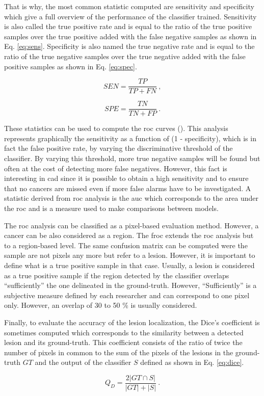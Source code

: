That is why, the most common statistic computed are sensitivity and specificity which give a full overview of the performance of the classifier trained. Sensitivity is also called the true positive rate and is equal to the ratio of the true positive samples over the true positive added with the false negative samples as shown in Eq. \eqref{eq:sens}. Specificity is also named the true negative rate and is equal to the ratio of the true negative samples over the true negative added with the false positive samples as shown in Eq. \eqref{eq:spec}.

\begin{equation}
	SEN = \frac{TP}{TP+FN} \ ,
	\label{eq:sens}
\end{equation}

\begin{equation}
	SPE = \frac{TN}{TN+FP} \ .
	\label{eq:spec}
\end{equation}

These statistics can be used to compute the \acf{roc} curves (\cite{Metz2006}). This analysis represents graphically the sensitivity as a function of (1 - specificity), which is in fact the false positive rate, by varying the discriminative threshold of the classifier. By varying this threshold, more true negative samples will be found but often at the cost of detecting more false negatives. However, this fact is interesting in \ac{cad} since it is possible to obtain a high sensitivity and to ensure that no cancers are missed even if more false alarms have to be investigated. A statistic derived from \ac{roc} analysis is the \acf{auc} which corresponds to the area under the \ac{roc} and is a measure used to make comparisons between models.

The \ac{roc} analysis can be classified as a pixel-based evaluation method. However, a cancer can be also considered as a region. The \acf{froc} extends the \ac{roc} analysis but to a region-based level. The same confusion matrix can be computed were the sample are not pixels any more but refer to a lesion. However, it is important to define what is a true positive sample in that case. Usually, a lesion is considered as a true positive sample if the region detected by the classifier overlaps ``sufficiently'' the one delineated in the ground-truth. However, ``Sufficiently'' is a subjective measure defined by each researcher and can correspond to one pixel only. However, an overlap of 30 to 50 \% is usually considered.

Finally, to evaluate the accuracy of the lesion localization, the Dice's coefficient is sometimes computed which corresponds to the similarity between a detected lesion and its ground-truth. This coefficient consists of the ratio of twice the number of pixels in common to the sum of the pixels of the lesions in the ground-truth $GT$ and the output of the classifier $S$ defined as shown in Eq. \eqref{eq:dice}.

\begin{equation}
	Q_D = \frac{2 | GT \cap S |}{| GT | + | S |} \ .
	\label{eq:dice}
\end{equation}